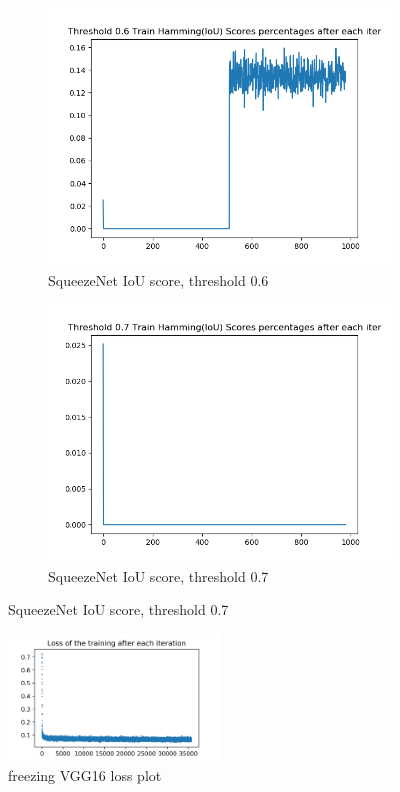 \begin{figure}[!ht]
\centering
\begin{subfigure}{.5\textwidth}
	\centering
	\includegraphics[width=0.9\linewidth]{squeezenet-lazy-1-train-scores-hs-6.png}
	\caption{\label{squeezenet:squeezenet-lazy-1-train-scores-hs-6}SqueezeNet IoU score, threshold 0.6}
\end{subfigure}%
\begin{subfigure}{.5\textwidth}
	\centering
	\includegraphics[width=0.9\linewidth]{squeezenet-lazy-1-train-scores-hs-7.png}
	\caption{\label{squeezenet:squeezenet-lazy-1-train-scores-hs-7}SqueezeNet IoU score, threshold 0.7}
\end{subfigure}
\end{figure}

\begin{figure}[!ht]
\centering
\includegraphics[width=0.5\textwidth]{vgg16-0_26-lazy-1-train-loss.png}
\caption{\label{vgg16:vgg16-ft-train-loss}freezing VGG16 loss plot}
\end{figure}

